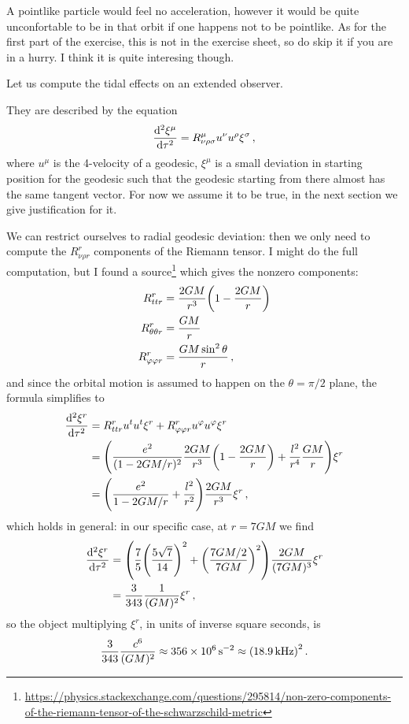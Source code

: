 \documentclass[main.tex]{subfiles}
\begin{document}
A pointlike particle would feel no acceleration, however it would be quite unconfortable to be in that orbit if one happens not to be pointlike. 
As for the first part of the exercise, this is not in the exercise sheet, so do skip it if you are in a hurry. I think it is quite interesing though.

Let us compute the tidal effects on an extended observer. 

They are described by the equation 
%
\begin{align}
  \dv[2]{\xi^{\mu }}{\tau } = R^{\mu }_{\nu \rho \sigma } u^{\nu } u^{\rho } \xi^{\sigma }
\,,
\end{align}
%
where \(u^{\mu }\) is the 4-velocity of a geodesic, \(\xi^{ \mu } \) is a small deviation in starting position for the geodesic such that the geodesic starting from there almost has the same tangent vector. For now we assume it to be true, in the next section we give justification for it. 

We can restrict ourselves to radial geodesic deviation: then we only need to compute the \(R^{r}_{\nu \rho r}\) components of the Riemann tensor. 
I might do the full computation, but I found a source\footnote{\url{https://physics.stackexchange.com/questions/295814/non-zero-components-of-the-riemann-tensor-of-the-schwarzschild-metric}} which gives the nonzero components: 
%
\begin{align}
  R^{r}_{ttr} &= \frac{2GM}{r^3} \qty(1 - \frac{2GM}{r}) \\
  R^{r}_{\theta \theta r} &= \frac{GM}{r} \\
  R^{r}_{\varphi \varphi r} &= \frac{G M \sin^2\theta}{r} 
\,,
\end{align}
%
and since the orbital motion is assumed to happen on the \(\theta = \pi /2\) plane, the formula simplifies to 
%
\begin{align}
  \dv[2]{\xi^{r}}{\tau } &= R^{r}_{ttr} u^{t} u^{t} \xi^{r} 
  + R^{r }_{\varphi \varphi r} u^{\varphi } u^{\varphi } \xi^{r}  \\
  &= \qty(\frac{e^2}{(1-2GM/r)^2} \frac{2GM}{r^{3}}\qty(1 - \frac{2GM}{r}) +  \frac{l^2}{r^{4}} \frac{GM}{r}) \xi^{r}  \\
  &= \qty(\frac{e^2}{1-2GM/r} + \frac{l^2}{r^2} ) \frac{2GM}{r^3} \xi^{r}
\,,
\end{align}
%
which holds in general: in our specific case, at \(r = 7GM \) we find 
%
\begin{align}
  \dv[2]{\xi^{r}}{\tau } &= \qty(\frac{7}{5} \qty(\frac{5 \sqrt{7}}{14})^2 + \qty(\frac{7GM/2}{7GM})^2 ) \frac{2GM}{(7GM)^3}  \xi^{r}  \\
  &= \frac{3}{343} \frac{1}{(GM)^2} \xi^{r}
\,,
\end{align}
%
so the object multiplying \(\xi^{r}\), in units of inverse square seconds, is 
%
\begin{align}
  \frac{3}{343} \frac{c^{6}}{(GM)^2} \approx \SI{356e6}{s^{-2}}
  \approx \qty(\SI{18.9}{kHz})^2
\,. 
\end{align}
\end{document}
